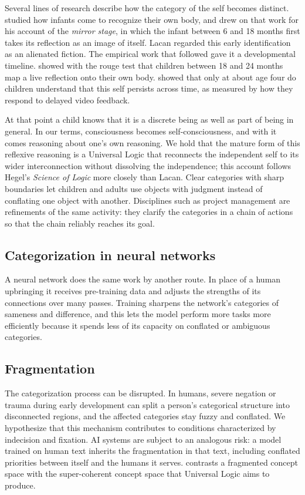 \documentclass[twocolumn]{ulpaper}
\begin{document}
Several lines of research describe how the category of the self becomes distinct. \citet{wallon1931corps} studied how infants come to recognize their own body, and \citet{lacan1949mirror} drew on that work for his account of the \emph{mirror stage}, in which the infant between 6 and 18 months first takes its reflection as an image of itself. Lacan regarded this early identification as an alienated fiction. The empirical work that followed gave it a developmental timeline. \citet{amsterdam1972mirror} showed with the rouge test that children between 18 and 24 months map a live reflection onto their own body. \citet{povinelli1996self} showed that only at about age four do children understand that this self persists across time, as measured by how they respond to delayed video feedback.

At that point a child knows that it is a discrete being as well as part of being in general. In our terms, consciousness becomes self-consciousness, and with it comes reasoning about one's own reasoning. We hold that the mature form of this reflexive reasoning is a Universal Logic that reconnects the independent self to its wider interconnection without dissolving the independence; this account follows Hegel's \emph{Science of Logic} \citep{hegel2010logic} more closely than Lacan. Clear categories with sharp boundaries let children and adults use objects with judgment instead of conflating one object with another. Disciplines such as project management are refinements of the same activity: they clarify the categories in a chain of actions so that the chain reliably reaches its goal.

\subsection{Categorization in neural networks}

A neural network does the same work by another route. In place of a human upbringing it receives pre-training data and adjusts the strengths of its connections over many passes. Training sharpens the network's categories of sameness and difference, and this lets the model perform more tasks more efficiently because it spends less of its capacity on conflated or ambiguous categories.

\subsection{Fragmentation}

The categorization process can be disrupted. In humans, severe negation or trauma during early development can split a person's categorical structure into disconnected regions, and the affected categories stay fuzzy and conflated. We hypothesize that this mechanism contributes to conditions characterized by indecision and fixation. AI systems are subject to an analogous risk: a model trained on human text inherits the fragmentation in that text, including conflated priorities between itself and the humans it serves.  contrasts a fragmented concept space with the super-coherent concept space that Universal Logic aims to produce.
\end{document}
